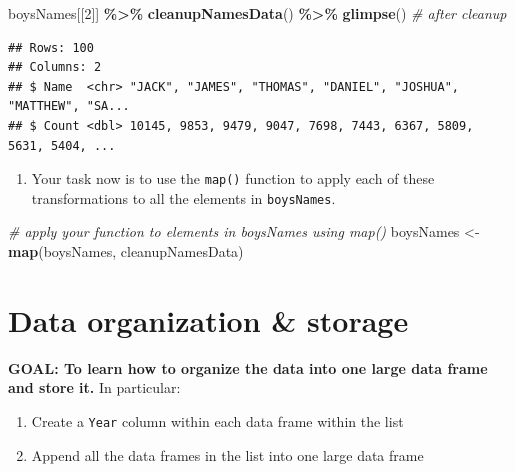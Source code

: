 \documentclass[
]{book}
\newenvironment{Shaded}{\begin{snugshade}}{\end{snugshade}}
\newcommand{\CommentTok}[1]{\textcolor[rgb]{0.56,0.35,0.01}{\textit{#1}}}
\newcommand{\DecValTok}[1]{\textcolor[rgb]{0.00,0.00,0.81}{#1}}
\newcommand{\KeywordTok}[1]{\textcolor[rgb]{0.13,0.29,0.53}{\textbf{#1}}}
\newcommand{\NormalTok}[1]{#1}
\newcommand{\OperatorTok}[1]{\textcolor[rgb]{0.81,0.36,0.00}{\textbf{#1}}}
\newcommand{\StringTok}[1]{\textcolor[rgb]{0.31,0.60,0.02}{#1}}
\providecommand{\tightlist}{%
  \setlength{\itemsep}{0pt}\setlength{\parskip}{0pt}}
\begin{document}
\begin{Shaded}
\begin{Highlighting}[]
\NormalTok{boysNames[[}\DecValTok{2}\NormalTok{]] }\OperatorTok{\%\textgreater{}\%}\StringTok{ }\KeywordTok{cleanupNamesData}\NormalTok{() }\OperatorTok{\%\textgreater{}\%}\StringTok{ }\KeywordTok{glimpse}\NormalTok{() }\CommentTok{\# after cleanup}
\end{Highlighting}
\end{Shaded}

\begin{verbatim}
## Rows: 100
## Columns: 2
## $ Name  <chr> "JACK", "JAMES", "THOMAS", "DANIEL", "JOSHUA", "MATTHEW", "SA...
## $ Count <dbl> 10145, 9853, 9479, 9047, 7698, 7443, 6367, 5809, 5631, 5404, ...
\end{verbatim}

\begin{enumerate}
\def\labelenumi{\arabic{enumi}.}
\setcounter{enumi}{1}
\tightlist
\item
  Your task now is to use the \texttt{map()} function to apply each of these transformations to all the elements in \texttt{boysNames}.
\end{enumerate}

\begin{Shaded}
\begin{Highlighting}[]
\CommentTok{\# apply your function to elements in \textasciigrave{}boysNames\textasciigrave{} using \textasciigrave{}map()\textasciigrave{}}
\NormalTok{boysNames \textless{}{-}}\StringTok{ }\KeywordTok{map}\NormalTok{(boysNames, cleanupNamesData)}
\end{Highlighting}
\end{Shaded}

\hypertarget{data-organization-storage}{%
\section{Data organization \& storage}\label{data-organization-storage}}

\textbf{GOAL: To learn how to organize the data into one large data frame and store it.} In particular:

\begin{enumerate}
\def\labelenumi{\arabic{enumi}.}
\tightlist
\item
  Create a \texttt{Year} column within each data frame within the list
\item
  Append all the data frames in the list into one large data frame
\end{enumerate}
\end{document}
